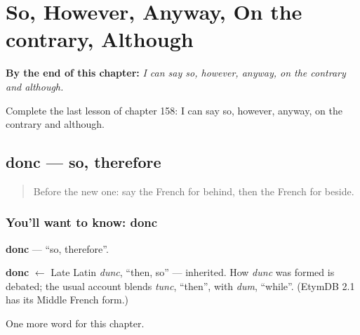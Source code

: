 
\chapter{So, However, Anyway, On the contrary, Although}
\label{ch:fr-so-however-anyway-on-the-contrary-although}

\begin{chapteropening}
\textbf{By the end of this chapter:} \emph{I can say so, however, anyway, on the contrary and although.}

Complete the last lesson of chapter 158: I can say so, however, anyway, on the contrary and although.
\end{chapteropening}

\section[donc]{donc — so, therefore}

\label{lesson:FR-C158-donc}



\begin{quote}
Before the new one: say the French for behind, then the French for beside.
\end{quote}

\subsection*{You'll want to know: donc}
\textbf{donc} — \textquotedblleft{}so, therefore\textquotedblright{}.

\begin{cousinweb}
\textbf{donc} $\leftarrow$ Late Latin \emph{dunc}, \textquotedblleft{}then, so\textquotedblright{} — inherited. How \emph{dunc} was formed is debated; the usual account blends \emph{tunc}, \textquotedblleft{}then\textquotedblright{}, with \emph{dum}, \textquotedblleft{}while\textquotedblright{}. (EtymDB 2.1 has its Middle French form.)
\end{cousinweb}

\begin{grammarlens}[title={What you've built}]
One more word for this chapter.
\end{grammarlens}

